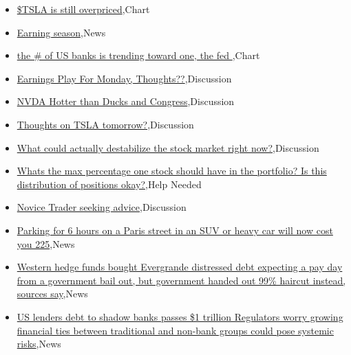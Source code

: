 \documentclass{article}%
\begin{document}
%
\begin{itemize}%
\item%
\href{https://reddit.com/r/wallstreetbets/comments/1aowaz4/tsla\_is\_still\_overpriced/}{\$TSLA is still overpriced},Chart%
\item%
\href{https://reddit.com/r/wallstreetbets/comments/1aovux1/earning\_season/}{Earning season},News%
\item%
\href{https://reddit.com/r/wallstreetbets/comments/1aouk7s/the\_of\_us\_banks\_is\_trending\_toward\_one\_the\_fed/}{the \# of US banks is trending toward one, the fed },Chart%
\item%
\href{https://reddit.com/r/wallstreetbets/comments/1aoubzn/earnings\_play\_for\_monday\_thoughts/}{Earnings Play For Monday, Thoughts??},Discussion%
\item%
\href{https://reddit.com/r/wallstreetbets/comments/1aoua1d/nvda\_hotter\_than\_ducks\_and\_congress/}{NVDA Hotter than Ducks and Congress},Discussion%
\item%
\href{https://reddit.com/r/wallstreetbets/comments/1aor79h/thoughts\_on\_tsla\_tomorrow/}{Thoughts on TSLA tomorrow?},Discussion%
\item%
\href{https://reddit.com/r/StockMarket/comments/1aoqfgz/what\_could\_actually\_destabilize\_the\_stock\_market/}{What could actually destabilize the stock market right now?},Discussion%
\item%
\href{https://reddit.com/r/StockMarket/comments/1aod8qc/whats\_the\_max\_percentage\_one\_stock\_should\_have\_in/}{Whats the max percentage one stock should have in the portfolio? Is this distribution of positions okay?},Help Needed%
\item%
\href{https://reddit.com/r/StockMarket/comments/1ao2ggh/novice\_trader\_seeking\_advice/}{Novice Trader seeking advice},Discussion%
\item%
\href{https://reddit.com/r/Economics/comments/1aowwse/parking\_for\_6\_hours\_on\_a\_paris\_street\_in\_an\_suv/}{Parking for 6 hours on a Paris street in an SUV or heavy car will now cost you 225},News%
\item%
\href{https://reddit.com/r/Economics/comments/1aonm54/western\_hedge\_funds\_bought\_evergrande\_distressed/}{Western hedge funds bought Evergrande distressed debt expecting a pay day from a government bail out, but government handed out 99\% haircut instead, sources say},News%
\item%
\href{https://reddit.com/r/Economics/comments/1aojz22/us\_lenders\_debt\_to\_shadow\_banks\_passes\_1\_trillion/}{US lenders debt to shadow banks passes \$1 trillion  Regulators worry growing financial ties between traditional and non-bank groups could pose systemic risks},News%

\end{itemize}
\end{document}
